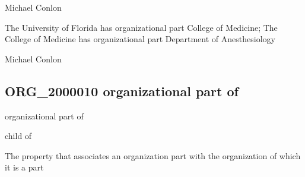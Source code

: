\documentclass[letterpaper,10pt,english]{sphinxmanual}
\begin{document}
\begin{sphinxShadowBox}

\sphinxAtStartPar
Michael Conlon 
\end{sphinxShadowBox}

\begin{sphinxShadowBox}

\sphinxAtStartPar
The University of Florida has organizational part College of Medicine; The College of Medicine has organizational part Department of Anesthesiology
\end{sphinxShadowBox}

\begin{sphinxShadowBox}

\sphinxAtStartPar
Michael Conlon 
\end{sphinxShadowBox}
\begin{quote}

\ignorespaces \end{quote}


\subsection{ORG\_2000010 \sphinxhyphen{} organizational part of}
\label{\detokenize{doc-ORG_2000010:org-2000010-organizational-part-of}}\label{\detokenize{doc-ORG_2000010:index-0}}\label{\detokenize{doc-ORG_2000010::doc}}
\begin{sphinxShadowBox}

\sphinxAtStartPar
organizational part of
\end{sphinxShadowBox}

\begin{sphinxShadowBox}

\sphinxAtStartPar
child of
\end{sphinxShadowBox}

\begin{sphinxShadowBox}

\sphinxAtStartPar
The property that associates an organization part with the organization of which it is a part
\end{sphinxShadowBox}
\end{document}
